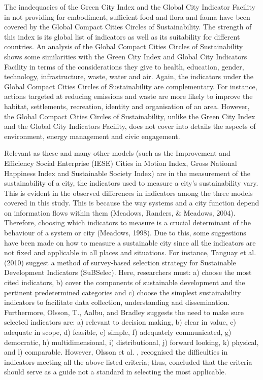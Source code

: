 The inadequacies of the Green City Index and the Global City Indicator Facility in not providing for embodiment, sufficient food and flora and fauna have been covered by the Global Compact Cities Circles of Sustainability. The strength of this index is its global list of indicators as well as its suitability for different countries. An analysis of the Global Compact Cities Circles of Sustainability shows some similarities with the Green City Index and Global City Indicators Facility in terms of the considerations they give to health, education, gender, technology, infrastructure, waste, water and air. Again, the indicators under the Global Compact Cities Circles of Sustainability are complementary. For instance, actions targeted at reducing emissions and waste are more likely to improve the habitat, settlements, recreation, identity and organisation of an area. However, the Global Compact Cities Circles of Sustainability, unlike the Green City Index and the Global City Indicators Facility, does not cover into details the aspects of environment, energy management and civic engagement.

Relevant as these and many other models (such as the Improvement and Efficiency Social Enterprise (IESE) Cities in Motion Index, Gross National Happiness Index and Sustainable Society Index) are in the measurement of the sustainability of a city, the indicators used to measure a city's sustainability vary. This is evident in the observed differences in indicators among the three models covered in this study. This is because the way systems and a city function depend on information flows within them (Meadows, Randers, \& Meadows, 2004). Therefore, choosing which indicators to measure is a crucial determinant of the behaviour of a system or city (Meadows, 1998). Due to this, some suggestions have been made on how to measure a sustainable city since all the indicators are not fixed and applicable in all places and situations. For instance, Tanguay et al. (2010) suggest a method of survey-based selection strategy for Sustainable Development Indicators (SuBSelec). Here, researchers must: a) choose the most cited indicators, b) cover the components of sustainable development and the pertinent predetermined categories and c) choose the simplest sustainability indicators to facilitate data collection, understanding and dissemination. Furthermore, Olsson, T., Aalbu, and Bradley \cite{Olsson2004} suggests the need to make sure selected indicators are: a) relevant to decision making, b) clear in value, c) adequate in scope, d) feasible, e) simple, f) adequately communicated, g) democratic, h) multidimensional, i) distributional, j) forward looking, k) physical, and l) comparable. However, Olsson et al. \cite{Olsson2004}, recognised the difficulties in indicators meeting all the above listed criteria; thus, concluded that the criteria should serve as a guide not a standard in selecting the most applicable.


